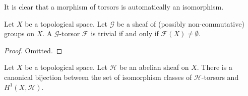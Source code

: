 \noindent
It is clear that a morphism of torsors is automatically an isomorphism.

\begin{lemma}
\label{lemma-trivial-torsor}
Let $X$ be a topological space.
Let $\mathcal{G}$ be a sheaf of (possibly non-commutative) groups on $X$.
A $\mathcal{G}$-torsor $\mathcal{F}$ is trivial if and only if
$\mathcal{F}(X) \not = \emptyset$.
\end{lemma}

\begin{proof}
Omitted.
\end{proof}

\begin{lemma}
\label{lemma-torsors-h1}
Let $X$ be a topological space.
Let $\mathcal{H}$ be an abelian sheaf on $X$.
There is a canonical bijection between the set of isomorphism
classes of $\mathcal{H}$-torsors and $H^1(X, \mathcal{H})$.
\end{lemma}

